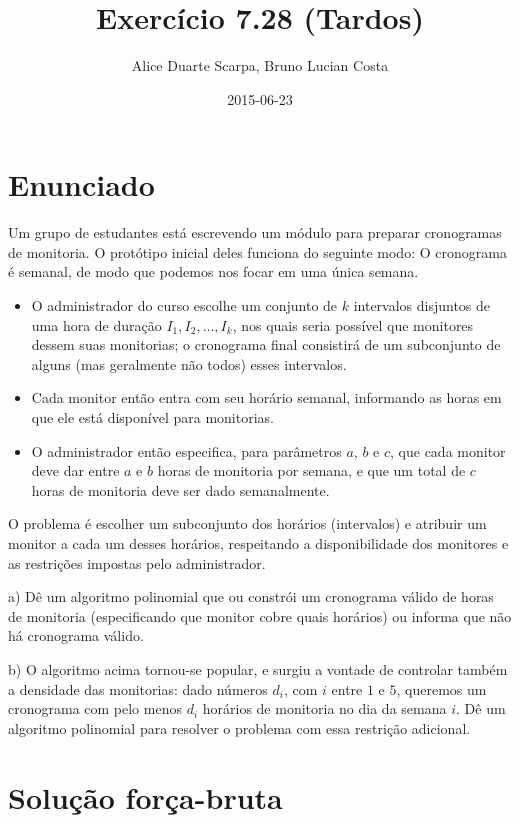 \documentclass[11pt]{article}
\author{Alice Duarte Scarpa, Bruno Lucian Costa}
\date{2015-06-23}
\title{Exercício 7.28 (Tardos)}
\begin{document}
\maketitle

\section{Enunciado}
\label{sec-1}

Um grupo de estudantes está escrevendo um módulo para preparar
cronogramas de monitoria. O protótipo inicial deles funciona do
seguinte modo: O cronograma é semanal, de modo que podemos nos focar
em uma única semana.

\begin{itemize}
\item O administrador do curso escolhe um conjunto de $k$
intervalos disjuntos de uma hora de duração $I_1, I_2, \ldots,
      I_k$, nos quais seria possível que monitores dessem suas
monitorias; o cronograma final consistirá de um subconjunto de
alguns (mas geralmente não todos) esses intervalos.
\item Cada monitor então entra com seu horário semanal, informando
as horas em que ele está disponível para monitorias.
\item O administrador então especifica, para parâmetros $a$, $b$ e
$c$, que cada monitor deve dar entre $a$ e $b$ horas de
monitoria por semana, e que um total de $c$ horas de monitoria
deve ser dado semanalmente.
\end{itemize}

O problema é escolher um subconjunto dos horários (intervalos) e
atribuir um monitor a cada um desses horários, respeitando a
disponibilidade dos monitores e as restrições impostas pelo
administrador.


a) Dê um algoritmo polinomial que ou constrói um cronograma
   válido de horas de monitoria (especificando que monitor cobre
   quais horários) ou informa que não há cronograma válido.


b) O algoritmo acima tornou-se popular, e surgiu a vontade de
   controlar também a densidade das monitorias: dado números $d_i$,
   com $i$ entre $1$ e $5$, queremos um cronograma com pelo menos
   $d_i$ horários de monitoria no dia da semana $i$. Dê um
   algoritmo polinomial para resolver o problema com essa restrição
   adicional.

\section{Solução força-bruta}
\label{sec-2}
\end{document}
